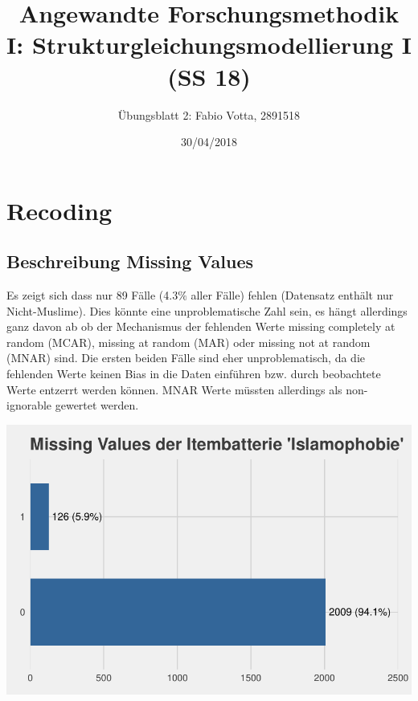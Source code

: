 \documentclass[]{article}
\title{Angewandte Forschungsmethodik I: Strukturgleichungsmodellierung I (SS
18)}
\author{Übungsblatt 2: Fabio Votta, 2891518}
\date{30/04/2018}
\newenvironment{Shaded}{\begin{snugshade}}{\end{snugshade}}
\newcommand{\KeywordTok}[1]{\textcolor[rgb]{0.13,0.29,0.53}{\textbf{#1}}}
\newcommand{\DataTypeTok}[1]{\textcolor[rgb]{0.13,0.29,0.53}{#1}}
\newcommand{\DecValTok}[1]{\textcolor[rgb]{0.00,0.00,0.81}{#1}}
\newcommand{\StringTok}[1]{\textcolor[rgb]{0.31,0.60,0.02}{#1}}
\newcommand{\CommentTok}[1]{\textcolor[rgb]{0.56,0.35,0.01}{\textit{#1}}}
\newcommand{\OperatorTok}[1]{\textcolor[rgb]{0.81,0.36,0.00}{\textbf{#1}}}
\newcommand{\NormalTok}[1]{#1}
\begin{document}
\maketitle

\section{Recoding}\label{recoding}

\begin{Shaded}
\end{Shaded}

\subsection{\texorpdfstring{\textbf{Beschreibung Missing
Values}}{Beschreibung Missing Values}}\label{beschreibung-missing-values}

Es zeigt sich dass nur 89 Fälle (4.3\(\%\) aller Fälle) fehlen
(Datensatz enthält nur Nicht-Muslime). Dies könnte eine unproblematische
Zahl sein, es hängt allerdings ganz davon ab ob der Mechanismus der
fehlenden Werte missing completely at random (MCAR), missing at random
(MAR) oder missing not at random (MNAR) sind. Die ersten beiden Fälle
sind eher unproblematisch, da die fehlenden Werte keinen Bias in die
Daten einführen bzw. durch beobachtete Werte entzerrt werden können.
MNAR Werte müssten allerdings als non-ignorable gewertet werden.

\begin{center}\includegraphics{ua2_files/figure-latex/unnamed-chunk-1-1} \end{center}
\end{document}
